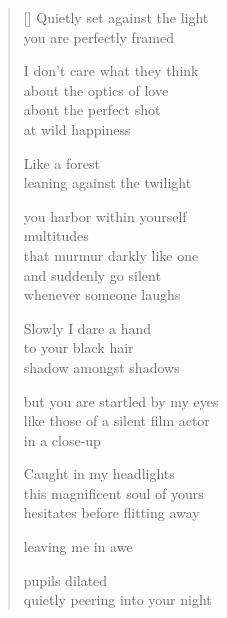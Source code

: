 \documentclass[12pt,a4paper]{article}
\begin{document}
\begin{verse}[\versewidth]
  Quietly set against the light \\
  you are perfectly framed

  I don't care what they think \\
  about the optics of love \\
  about the perfect shot \\
  at wild happiness

  Like a forest \\
  leaning against the twilight

  you harbor within yourself \\
  multitudes \\
  that murmur darkly like one \\
  and suddenly go silent \\
  whenever someone laughs

  Slowly I dare a hand \\
  to your black hair \\
  shadow amongst shadows

  but you are startled by my eyes \\
  like those of a silent film actor \\
  in a close-up

  Caught in my headlights \\
  this magnificent soul of yours \\
  hesitates before flitting away

  leaving me in awe

  pupils dilated \\
  quietly peering into your night
\end{verse}


\newpage

\poemtitle{}

\settowidth{\versewidth}{of ripped curtains of mist}

\bigskip
\end{document}
